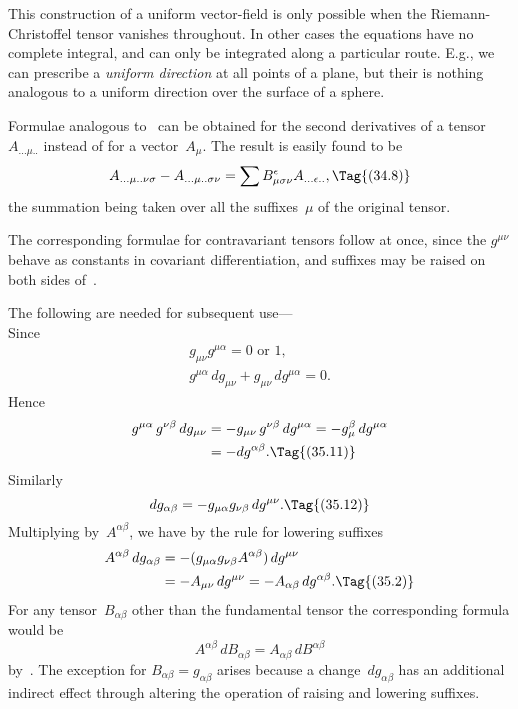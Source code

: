 \documentclass[12pt]{book}
\begin{document}
This construction of a uniform vector-field is only possible when the
Riemann-Christoffel tensor vanishes throughout. In other cases the equations
have no complete integral, and can only be integrated along a particular route.
E.g., we can prescribe a \emph{uniform direction} at all points of a plane, but their is
nothing analogous to a uniform direction over the surface of a sphere.

Formulae analogous to~ can be obtained for the second derivatives
of a tensor~$A_{...\mu..}$ instead of for a vector~$A_{\mu}$. The result is easily found to be
\[
A_{...\mu..\nu\sigma} - A_{...\mu..\sigma\nu} = \sum B_{\mu\sigma\nu}^{\epsilon} A_{...\epsilon..},
\Tag{(34.8)}
\]
the summation being taken over all the suffixes~$\mu$ of the original tensor.

The corresponding formulae for contravariant tensors follow at once, since
the $g^{\mu\nu}$ behave as constants in covariant differentiation, and suffixes may be
raised on both sides of~.


The following are needed for subsequent use--- \\
Since
\begin{gather*}
g_{\mu\nu} g^{\mu\alpha} = \text{$0$ or $1$,} \\
g^{\mu\alpha} \, dg_{\mu\nu} + g_{\mu\nu}\, dg^{\mu\alpha} = 0.
\end{gather*}
Hence
\begin{align*}
  g^{\mu\alpha}\, g^{\nu\beta} \, dg_{\mu\nu}
  &= -g_{\mu\nu}\, g^{\nu\beta}\, dg^{\mu\alpha}
   = -g_{\mu}^{\beta}\, dg^{\mu\alpha} \\
  &= -dg^{\alpha\beta}.
  \Tag{(35.11)}
\end{align*}
Similarly
\[
dg_{\alpha\beta} = -g_{\mu\alpha} g_{\nu\beta}\, dg^{\mu\nu}.
\Tag{(35.12)}
\]
Multiplying by~$A^{\alpha\beta}$, we have by the rule for lowering suffixes
\begin{align*}
  A^{\alpha\beta}\, dg_{\alpha\beta}
  &= -(g_{\mu\alpha} g_{\nu\beta}A^{\alpha\beta})\, dg^{\mu\nu} \\
  &= -A_{\mu\nu}\, dg^{\mu\nu}
   = -A_{\alpha\beta}\, dg^{\alpha\beta}.
  \Tag{(35.2)}
\end{align*}
For any tensor~$B_{\alpha\beta}$ other than the fundamental tensor the corresponding
formula would be
\[
A^{\alpha\beta}\, dB_{\alpha\beta} = A_{\alpha\beta}\, dB^{\alpha\beta}
\]
by~. The exception for $B_{\alpha\beta} = g_{\alpha\beta}$ arises because a change~$dg_{\alpha\beta}$ has an
additional indirect effect through altering the operation of raising and lowering
suffixes.
\end{document}

